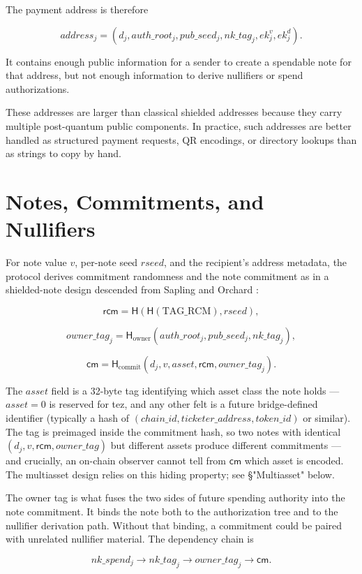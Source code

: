 \documentclass[11pt]{article}
\newcommand{\Hash}{\mathsf{H}}
\newcommand{\cm}{\mathsf{cm}}
\newcommand{\rcm}{\mathsf{rcm}}
\begin{document}
The payment address is therefore

\[
address_j = (d_j, auth\_root_j, pub\_seed_j, nk\_tag_j, ek^v_j, ek^d_j).
\]

It contains enough public information for a sender to create a spendable note
for that address, but not enough information to derive nullifiers or spend
authorizations.

These addresses are larger than classical shielded addresses because they carry
multiple post-quantum public components. In practice, such addresses are better
handled as structured payment requests, QR encodings, or directory lookups than
as strings to copy by hand.

\section{Notes, Commitments, and Nullifiers}

For note value \(v\), per-note seed \(rseed\), and the recipient's address
metadata, the protocol derives commitment randomness and the note commitment as
in a shielded-note design descended from Sapling and Orchard
\cite{zcash-protocol,zcash-orchard}:

\[
\rcm = \Hash(\Hash(\mathrm{TAG\_RCM}), rseed),
\]

\[
owner\_tag_j = \Hash_{\mathrm{owner}}(auth\_root_j, pub\_seed_j, nk\_tag_j),
\]

\[
\cm = \Hash_{\mathrm{commit}}(d_j, v, asset, \rcm, owner\_tag_j).
\]

The \(asset\) field is a 32-byte tag identifying which asset class the note
holds — \(asset = 0\) is reserved for tez, and any other felt is a future
bridge-defined identifier (typically a hash of \((chain\_id, ticketer\_address,
token\_id)\) or similar). The tag is preimaged inside the commitment hash,
so two notes with identical \((d_j, v, \rcm, owner\_tag)\) but different
assets produce different commitments — and crucially, an on-chain observer
cannot tell from \(\cm\) which asset is encoded. The multiasset design
relies on this hiding property; see §"Multiasset" below.

The owner tag is what fuses the two sides of future spending authority into the
note commitment. It binds the note both to the authorization tree and to the
nullifier derivation path. Without that binding, a commitment could be paired
with unrelated nullifier material. The dependency chain is

\[
nk\_spend_j \rightarrow nk\_tag_j \rightarrow owner\_tag_j \rightarrow \cm.
\]
\end{document}
